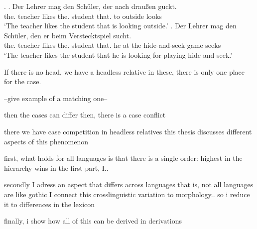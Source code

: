 \ex.\label{ex:germanrelatives}
\ag. Der Lehrer mag den Schüler, der nach draußen guckt.\\
 the. teacher likes the. student that. to outside looks\\
 `The teacher likes the student that is looking outside.'\label{ex:germanrelative1}
 \bg. Der Lehrer mag den Schüler, den er beim Verstecktspiel sucht.\\
 the. teacher likes the. student that. he {at the} {hide-and-seek game} seeks\\
 `The teacher likes the student that he is looking for playing hide-and-seek.'\label{ex:germanrelative2}

If there is no head, we have a headless relative
in these, there is only one place for the case.

--give example of a matching one--

then the cases can differ
then, there is a case conflict

there we have case competition in headless relatives
this thesis discusses different aspects of this phenomenon

first, what holds for all languages is that there is a single order: highest in the hierarchy wins
in the first part, I..

secondly I adress an aspect that differs across languages
that is, not all languages are like gothic
I connect this crosslinguistic variation to morphology.. so i reduce it to differences in the lexicon

finally, i show how all of this can be derived in derivations
